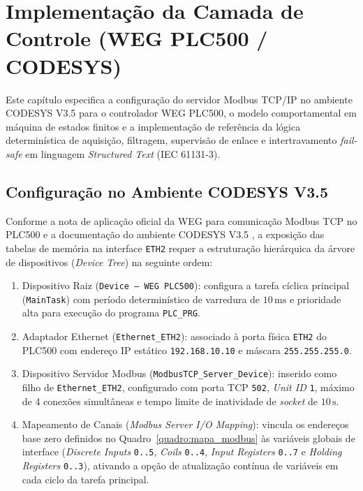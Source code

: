 
\chapter{Implementação da Camada de Controle (WEG PLC500 / CODESYS)}
\label{cap:implementacao_clp}

Este capítulo especifica a configuração do servidor Modbus TCP/IP no ambiente CODESYS V3.5 para o controlador WEG PLC500, o modelo comportamental em máquina de estados finitos e a implementação de referência da lógica determinística de aquisição, filtragem, supervisão de enlace e intertravamento \textit{fail-safe} em linguagem \textit{Structured Text} (IEC 61131-3).

\section{Configuração no Ambiente CODESYS V3.5}
\label{sec:clp_codesys}

Conforme a nota de aplicação oficial da WEG para comunicação Modbus TCP no PLC500 \cite{weg_plc500_modbus} e a documentação do ambiente CODESYS V3.5 \cite{codesys_v35}, a exposição das tabelas de memória na interface \texttt{ETH2} requer a estruturação hierárquica da árvore de dispositivos (\textit{Device Tree}) na seguinte ordem:

\begin{enumerate}
  \item Dispositivo Raiz (\texttt{Device -- WEG PLC500}): configura a tarefa cíclica principal (\texttt{MainTask}) com período determinístico de varredura de $10\,\text{ms}$ e prioridade alta para execução do programa \texttt{PLC\_PRG}.
  \item Adaptador Ethernet (\texttt{Ethernet\_ETH2}): associado à porta física \texttt{ETH2} do PLC500 com endereço IP estático \texttt{192.168.10.10} e máscara \texttt{255.255.255.0}.
  \item Dispositivo Servidor Modbus (\texttt{ModbusTCP\_Server\_Device}): inserido como filho de \texttt{Ethernet\_ETH2}, configurado com porta TCP \texttt{502}, \textit{Unit ID} \texttt{1}, máximo de 4 conexões simultâneas e tempo limite de inatividade de \textit{socket} de $10\,\text{s}$.
  \item Mapeamento de Canais (\textit{Modbus Server I/O Mapping}): vincula os endereços base zero definidos no Quadro~\ref{quadro:mapa_modbus} às variáveis globais de interface (\textit{Discrete Inputs} \texttt{0..5}, \textit{Coils} \texttt{0..4}, \textit{Input Registers} \texttt{0..7} e \textit{Holding Registers} \texttt{0..3}), ativando a opção de atualização contínua de variáveis em cada ciclo da tarefa principal.
\end{enumerate}

